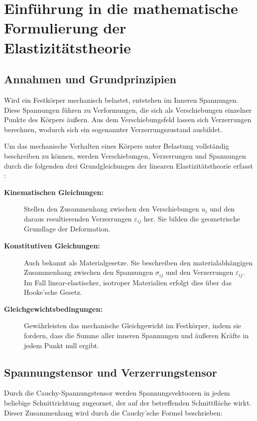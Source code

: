%
%
%
%
\section{Einführung in die mathematische Formulierung der Elastizitätstheorie}
\label{elastomechanik:section:teil2}
\subsection{Annahmen und Grundprinzipien}
Wird ein Festkörper mechanisch belastet, entstehen im Inneren Spannungen. Diese Spannungen führen zu Verformungen, die sich als Verschiebungen einzelner Punkte des Körpers äußern.
Aus dem Verschiebungsfeld lassen sich Verzerrungen berechnen, wodurch sich ein sogenannter Verzerrungszustand ausbildet.

Um das mechanische Verhalten eines Körpers unter Belastung vollständig beschreiben zu können, werden Verschiebungen, Verzerrungen und Spannungen durch die folgenden drei Grundgleichungen der linearen Elastizitätstheorie erfasst \cite{elastomechanik:Technische Mechanik 2:Elastostatik}:

\begin{description}
	\item [\textbf{Kinematischen Gleichungen:}] Stellen den Zusammenhang zwischen den Verschiebungen $u_i$ und den daraus resultierenden Verzerrungen $\varepsilon_{ij}$ her. 
	Sie bilden die geometrische Grundlage der Deformation.
	
	\item [\textbf{Konstitutiven Gleichungen:}] Auch bekannt als Materialgesetze. 
	Sie beschreiben den materialabhängigen Zusammenhang zwischen den Spannungen $\sigma_{ij}$ und den Verzerrungen $\varepsilon_{ij}$. 
	Im Fall linear-elastischer, isotroper Materialien erfolgt dies über das Hooke’sche Gesetz.
	
	\item [\textbf{Gleichgewichtsbedingungen:}] Gewährleisten das mechanische Gleichgewicht im Festkörper, indem sie fordern, dass die Summe aller inneren Spannungen und äußeren Kräfte in jedem Punkt null ergibt.
\end{description}

\subsection{Spannungstensor und Verzerrungstensor}
Durch die Cauchy-Spannungstensor werden Spannungsvektooren in jedem beliebige Schnittrichtung zugeornet, der auf der betreffenden Schnittfläche wirkt.
Dieser Zusammenhang wird durch die Cauchy’sche Formel beschrieben:

